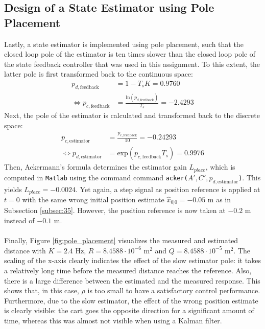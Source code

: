 \documentclass[a4paper,kul]{kulakarticle} %
\begin{document}
\subsection{Design of a State Estimator using Pole Placement}
Lastly, a state estimator is implemented using pole placement, such that the closed loop pole of the estimator is ten times slower than the closed loop pole of the state feedback controller that was used in this assignment. To this extent, the latter pole is first transformed back to the continuous space:
\begin{equation}
	\begin{split}
		p_{d, \text{feedback}} &= 1 - T_s K = 0.9760 \\
		\iff p_{c, \text{feedback}} &= \frac{\text{ln}(p_{d, \text{feedback}})}{T_s} = - 2.4293
	\end{split}
\end{equation}
Next, the pole of the estimator is calculated and transformed back to the discrete space:
\begin{equation}
	\begin{split}
		p_{c, \text{estimator}} &= \frac{p_{c, \text{feedback}}}{10} = - 0.24293 \\
		\iff p_{d, \text{estimator}} &= \text{exp}( p_{c, \text{feedback}} T_s) = 0.9976
	\end{split}
\end{equation}
Then, Ackermann's formula determines the estimator gain $L_{place}$, which is computed in \texttt{Matlab} using the command command \texttt{acker($A', C', p_{d, \text{estimator}}$)}. This yields $L_{place} = -0.0024$. Yet again, a step signal as position reference is applied at $t = 0$ with the same wrong initial position estimate $\hat{x}_{0|0} = -0.05$ m as in Subsection \ref{subsec:35}. However, the position reference is now taken at $-0.2$ m instead of $-0.1$ m.
\\\\
Finally, Figure \ref{fig:pole_placement} visualizes the measured and estimated distance with $K = 2.4$ Hz, $R = 8.4588\cdot10^{-6}$  m$^2$ and $Q = 8.4588\cdot10^{-5}$  m$^2$. The scaling of the x-axis clearly indicates the effect of the slow estimator pole: it takes a relatively long time before the measured distance reaches the reference. Also, there is a large difference between the estimated and the measured response. This shows that, in this case, $\rho$ is too small to have a satisfactory control performance. Furthermore, due to the slow estimator, the effect of the wrong position estimate is clearly visible: the cart goes the opposite direction for a significant amount of time, whereas this was almost not visible when using a Kalman filter.
\end{document}
